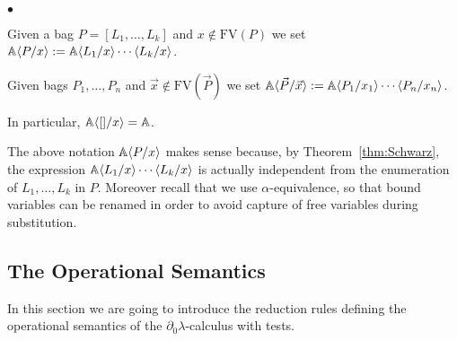 \documentclass{LMCS}
\newcommand{\dzlam}{\ensuremath{\partial_0\lambda}}
\newcommand{\FV}{\mathrm{FV}}
\newcommand{\ass}{:=}
\newcommand{\seq}[1]{\vec{#1}}
\newcommand{\sA}{\mathbb{A}}
\newcommand{\ga}{\alpha}
\begin{document}
\begin{nota}\
\begin{iteMize}{$\bullet$}
\item Given a bag $P=[L_1,\ldots,L_k]$ and $x\notin\FV(P)$ we set $\sA\lsubst{x}{P}\ass \sA\lsubst{x}{L_1}\cdots\lsubst{x}{L_k}$.

\item Given bags $P_1,\ldots,P_n$ and $\seq x\notin\FV(\seq P)$ we set $\sA\lsubst{\seq x}{\seq P}\ass \sA\lsubst{x_1}{P_1}\cdots\lsubst{x_n}{P_n}$.
\end{iteMize}
In particular, $\sA\lsubst{x}{[]} = \sA$.
\end{nota}

The above notation $\sA\lsubst{x}{P}$ makes sense because, by Theorem~\ref{thm:Schwarz}, the expression $\sA\lsubst{x}{L_1}\cdots\lsubst{x}{L_k}$ 
 is actually independent from the enumeration of $L_1,\ldots,L_k$ in $P$. Moreover recall that we use $\ga$-equivalence, so that bound variables can 
 be renamed in order to avoid capture of free variables during substitution.

\subsection{The Operational Semantics}\label{subs:OpSem}

In this section we are going to introduce the reduction rules defining the operational semantics of the \dzlam-calculus with tests.
\end{document}
